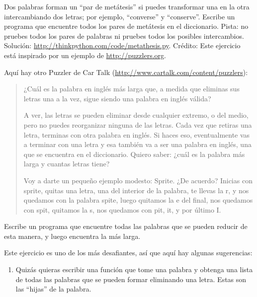 \documentclass[10pt]{book}
\begin{document}
\begin{exercise}

Dos palabras forman un ``par de metátesis'' si puedes transformar una en la
otra intercambiando dos letras; por ejemplo, ``converse'' y
``conserve''.  Escribe un programa que encuentre todos los pares de metátesis
en el diccionario.  Pista: no pruebes todos los pares de palabras ni
pruebes todos los posibles intercambios.  Solución:
\url{http://thinkpython.com/code/metathesis.py}.  Crédito: Este
ejercicio está inspirado por un ejemplo de \url{http://puzzlers.org}.

\end{exercise}


\begin{exercise}

Aquí hay otro Puzzler de Car Talk
(\url{http://www.cartalk.com/content/puzzlers}):

\begin{quote}
¿Cuál es la palabra en inglés más larga que, a medida que eliminas sus letras
una a la vez, sigue siendo una palabra en inglés válida?

A ver, las letras se pueden eliminar desde cualquier extremo, o del medio, pero
no puedes reorganizar ninguna de las letras. Cada vez que retiras una letra,
terminas con otra palabra en inglés. Si haces eso, eventualmente
vas a terminar con una letra y esa también va a ser una
palabra en inglés, una que se encuentra en el diccionario. Quiero saber:
¿cuál es la palabra más larga y cuantas letras
tiene?

Voy a darte un pequeño ejemplo modesto: Sprite. ¿De acuerdo? Inicias
con sprite, quitas una letra, una del interior de la
palabra, te llevas la r, y nos quedamos con la palabra spite, luego
quitamos la e del final, nos quedamos con spit, quitamos la s, nos
quedamos con pit, it, y por último I.
\end{quote}

Escribe un programa que encuentre todas las palabras que se pueden reducir de
esta manera, y luego encuentra la más larga.

Este ejercicio es uno de los más desafiantes, así que aquí hay
algunas sugerencias:

\begin{enumerate}

\item Quizás quieras escribir una función que tome una palabra y
  obtenga una lista de todas las palabras que se pueden formar eliminando una
  letra.  Estas son las ``hijas'' de la palabra.


\end{enumerate}
\end{exercise}
\end{document}
